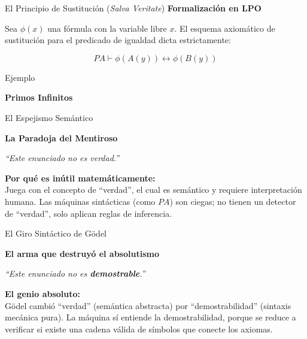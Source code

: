 \documentclass[10pt, aspectratio=169]{beamer}
\begin{document}
\begin{frame}{El Principio de Sustitución (\textit{Salva Veritate})}
    \vspace{0.6cm}
    \Large \textbf{Formalización en LPO}
    
    \vspace{0.4cm}
    \normalsize
    Sea $\phi(x)$ una fórmula con la variable libre $x$. El esquema axiomático de sustitución para el predicado de igualdad dicta estrictamente:
    
    \vspace{0.4cm}
    \huge
    $$PA \vdash  \phi (A(y)) \leftrightarrow \phi (B(y))$$
\end{frame}

\begin{frame}{Ejemplo}
    \vspace{2.5cm}
    \begin{center}
        \Huge \textbf{Primos Infinitos}
    \end{center}
\end{frame}

\begin{frame}{El Espejismo Semántico}
    \begin{center}
        \Large \textbf{La Paradoja del Mentiroso}
        
        \vspace{1.0cm}
        \huge \textit{``Este enunciado no es verdad.''}
        \vspace{1.0cm}
    \end{center}
    
    \normalsize
    \alert{\textbf{Por qué es inútil matemáticamente:}} \\
    Juega con el concepto de ``verdad'', el cual es semántico y requiere interpretación humana. Las máquinas sintácticas (como $PA$) son ciegas; no tienen un detector de ``verdad'', solo aplican reglas de inferencia.
\end{frame}

\begin{frame}{El Giro Sintáctico de Gödel}
    \begin{center}
        \Large \textbf{El arma que destruyó el absolutismo}
        
        \vspace{1.0cm}
        \huge \textit{``Este enunciado no es \textbf{demostrable}.''}
        \vspace{1.0cm}
    \end{center}
    
    \normalsize
    \alert{\textbf{El genio absoluto:}} \\
    Gödel cambió ``verdad'' (semántica abstracta) por ``demostrabilidad'' (sintaxis mecánica pura). La máquina sí entiende la demostrabilidad, porque se reduce a verificar si existe una cadena válida de símbolos que conecte los axiomas.
\end{frame}
\end{document}
